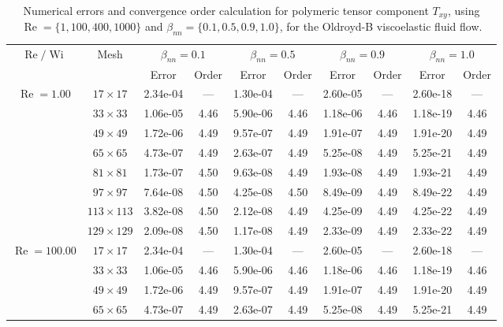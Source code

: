 \documentclass[preprint, 12pt]{elsarticle}
\begin{document}
{\begin{center}
\begin{table}[H]
\caption{Numerical errors and convergence order calculation for polymeric tensor component $T_{xy}$, using $\operatorname{Re}=\{1,100,400,1000\}$ and $\beta_{nn}=\{0.1,0.5,0.9,1.0\}$, for the Oldroyd-B viscoelastic fluid flow.\label{Appendix_tab_OldroydBTxyWi5_10}}
\tiny{
    \begin{tabular*}{\textwidth}{@{\extracolsep\fill}cccccccccc@{}}
    \hline
    \multirow{2}{*}{$\operatorname{Re}/\operatorname{Wi}$} & \multirow{2}{*}{Mesh} & \multicolumn{2}{c}{$\beta_{nn}=0.1$}  & \multicolumn{2}{c}{$\beta_{nn}=0.5$}  & \multicolumn{2}{c}{$\beta_{nn}=0.9$}  & \multicolumn{2}{c}{$\beta_{nn}=1.0$}\\ %
     & & Error & Order & Error & Order & Error & Order & Error & Order \\
    \hline
    \multirow{7}{*}{$\operatorname{Re}=1.00$} & $17\times 17$ & 2.34e-04 & --- & 1.30e-04 & --- & 2.60e-05 & --- & 2.60e-18 & --- \\
    & $33\times 33$ & 1.06e-05 & 4.46 & 5.90e-06 & 4.46 & 1.18e-06 & 4.46 & 1.18e-19 & 4.46 \\
    & $49\times 49$ & 1.72e-06 & 4.49 & 9.57e-07 & 4.49 & 1.91e-07 & 4.49 & 1.91e-20 & 4.49 \\
    \multirow{3}{*}{$\operatorname{Wi}=5$} & $65\times 65$ & 4.73e-07 & 4.49 & 2.63e-07 & 4.49 & 5.25e-08 & 4.49 & 5.25e-21 & 4.49 \\
    & $81\times 81$ & 1.73e-07 & 4.50 & 9.63e-08 & 4.49 & 1.93e-08 & 4.49 & 1.93e-21 & 4.49 \\
    & $97\times 97$ & 7.64e-08 & 4.50 & 4.25e-08 & 4.50 & 8.49e-09 & 4.49 & 8.49e-22 & 4.49 \\
    & $113\times 113$ & 3.82e-08 & 4.50 & 2.12e-08 & 4.49 & 4.25e-09 & 4.49 & 4.25e-22 & 4.49 \\
    & $129\times 129$ & 2.09e-08 & 4.50 & 1.17e-08 & 4.49 & 2.33e-09 & 4.49 & 2.33e-22 & 4.49 \\
    \hline
    \multirow{7}{*}{$\operatorname{Re}=100.00$} & $17\times 17$ & 2.34e-04 & --- & 1.30e-04 & --- & 2.60e-05 & --- & 2.60e-18 & --- \\
    & $33\times 33$ & 1.06e-05 & 4.46 & 5.90e-06 & 4.46 & 1.18e-06 & 4.46 & 1.18e-19 & 4.46 \\
    & $49\times 49$ & 1.72e-06 & 4.49 & 9.57e-07 & 4.49 & 1.91e-07 & 4.49 & 1.91e-20 & 4.49 \\
    \multirow{3}{*}{$\operatorname{Wi}=5$} & $65\times 65$ & 4.73e-07 & 4.49 & 2.63e-07 & 4.49 & 5.25e-08 & 4.49 & 5.25e-21 & 4.49 \\

\end{tabular*}}
\end{table}
\end{center}}
\end{document}
